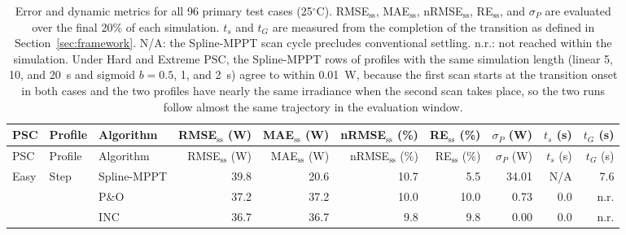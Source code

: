 \begingroup\scriptsize\setlength{\tabcolsep}{3.5pt}
\begin{longtable}{@{}lll rr rr r rr@{}}
\caption{Error and dynamic metrics for all 96 primary test cases (25$^\circ$C). RMSE$_\mathrm{ss}$, MAE$_\mathrm{ss}$, nRMSE$_\mathrm{ss}$, RE$_\mathrm{ss}$, and $\sigma_P$ are evaluated over the final 20\% of each simulation. $t_s$ and $t_G$ are measured from the completion of the transition as defined in Section~\ref{sec:framework}. N/A: the Spline-MPPT scan cycle precludes conventional settling. n.r.: not reached within the simulation. Under Hard and Extreme PSC, the Spline-MPPT rows of profiles with the same simulation length (linear 5, 10, and 20~s and sigmoid $b = 0.5$, 1, and 2~s) agree to within 0.01~W, because the first scan starts at the transition onset in both cases and the two profiles have nearly the same irradiance when the second scan takes place, so the two runs follow almost the same trajectory in the evaluation window.}\label{tab:app_metrics}\\
\toprule
PSC & Profile & Algorithm & \shortstack{RMSE$_\mathrm{ss}$\\(W)} & \shortstack{MAE$_\mathrm{ss}$\\(W)} & \shortstack{nRMSE$_\mathrm{ss}$\\(\%)} & \shortstack{RE$_\mathrm{ss}$\\(\%)} & \shortstack{$\sigma_P$\\(W)} & \shortstack{$t_s$\\(s)} & \shortstack{$t_G$\\(s)} \\
\midrule
\endfirsthead
\toprule
PSC & Profile & Algorithm & \shortstack{RMSE$_\mathrm{ss}$\\(W)} & \shortstack{MAE$_\mathrm{ss}$\\(W)} & \shortstack{nRMSE$_\mathrm{ss}$\\(\%)} & \shortstack{RE$_\mathrm{ss}$\\(\%)} & \shortstack{$\sigma_P$\\(W)} & \shortstack{$t_s$\\(s)} & \shortstack{$t_G$\\(s)} \\
\midrule
\endhead
\bottomrule
\endlastfoot
Easy & Step & Spline-MPPT & 39.8 & 20.6 & 10.7 & 5.5 & 34.01 & N/A & 7.6 \\
 &  & P\&O & 37.2 & 37.2 & 10.0 & 10.0 & 0.73 & 0.0 & n.r. \\
 &  & INC & 36.7 & 36.7 & 9.8 & 9.8 & 0.00 & 0.0 & n.r. \\

\end{longtable}
